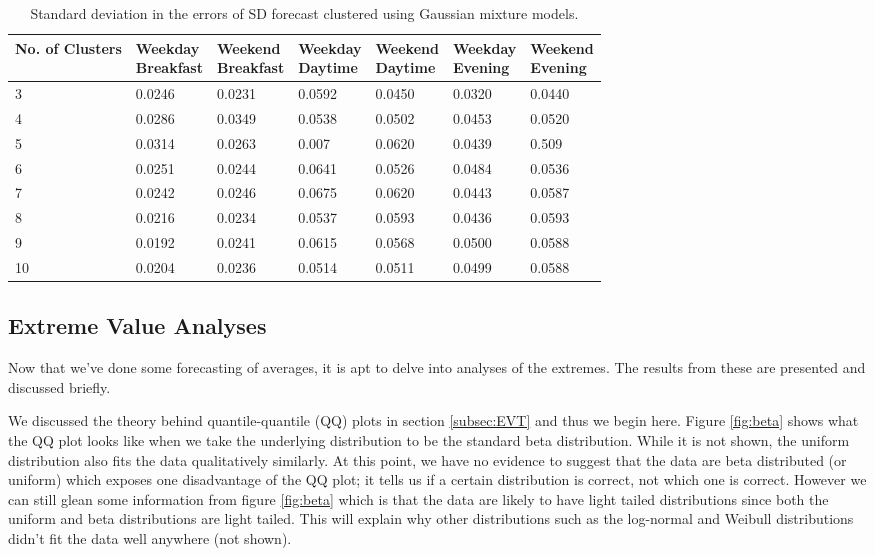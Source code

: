 \documentclass[a4paper]{article}
\begin{document}
\begin{table}
\centering
\begin{tabular}{|l|l|l|l|l|l|l|}
\hline
\textbf{No. of Clusters} & \thead{\textbf{Weekday} \\ \textbf{Breakfast}} &\thead{\textbf{Weekend} \\ \textbf{ Breakfast}} &\thead{\textbf{Weekday} \\ \textbf{Daytime}} &\thead{\textbf{Weekend} \\ \textbf{Daytime}} &\thead{\textbf{Weekday} \\ \textbf{Evening}} &\thead{\textbf{Weekend} \\ \textbf{Evening}} \\
\hline
3 & 0.0246 & 0.0231 & 0.0592 & 0.0450 & 0.0320 & 0.0440 \\
\hline
4  & 0.0286 & 0.0349 & 0.0538 & 0.0502 & 0.0453 & 0.0520 \\
\hline
5 & 0.0314 & 0.0263 & 0.007 & 0.0620 & 0.0439 & 0.509 \\
\hline
6 & 0.0251 & 0.0244 & 0.0641 & 0.0526 & 0.0484 & 0.0536 \\
\hline
7 & 0.0242 & 0.0246 & 0.0675 & 0.0620 & 0.0443 & 0.0587 \\
\hline
8 & 0.0216 & 0.0234 & 0.0537 & 0.0593 & 0.0436 & 0.0593 \\
\hline
9 & 0.0192 & 0.0241 & 0.0615 & 0.0568 & 0.0500 & 0.0588 \\
\hline
10 & 0.0204 & 0.0236 & 0.0514 & 0.0511 & 0.0499 & 0.0588 \\
\hline
\end{tabular}
\caption{Standard deviation in the errors of SD forecast clustered using Gaussian mixture models.}
\label{tab:cluserrs_gm_sd}
\end{table}



\subsection{Extreme Value Analyses}
\label{subsec:EVres}
Now that we've done some forecasting of averages, it is apt to delve into analyses of the extremes. The results from these are presented and discussed briefly.

We discussed the theory behind quantile-quantile (QQ) plots in section \ref{subsec:EVT} and thus we begin here. Figure \ref{fig:beta} shows what the QQ plot looks like when we take the underlying distribution to be the standard beta distribution. While it is not shown, the uniform distribution also fits the data qualitatively similarly. At this point, we have no evidence to suggest that the data are beta distributed (or uniform) which exposes one disadvantage of the QQ plot; it tells us if a certain distribution is correct, not which one is correct. However we can still glean some information from figure \ref{fig:beta} which is that the data are likely to have light tailed distributions since both the uniform and beta distributions are light tailed. This will explain why other distributions such as the log-normal and Weibull distributions didn't fit the data well anywhere (not shown). 
\end{document}
